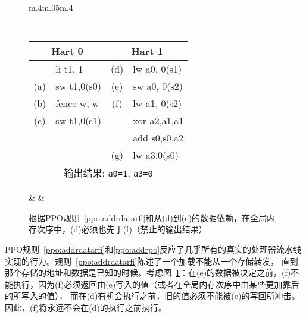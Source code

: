 \begin{figure}[h!]
  \centering
  \begin{tabular}{m{.4\linewidth}m{.05\linewidth}m{.4\linewidth}}
  {
    \tt\small
    \begin{tabular}{cl||cl}
    \multicolumn{2}{c}{Hart 0} & \multicolumn{2}{c}{Hart 1} \\
    \hline
          & li t1, 1    & (d) & lw a0, 0(s1)   \\
      (a) & sw t1,0(s0) & (e) & sw a0, 0(s2)   \\
      (b) & fence w, w  & (f) & lw a1, 0(s2)   \\
      (c) & sw t1,0(s1) &     & xor a2,a1,a1   \\
          &             &     & add s0,s0,a2   \\
          &             & (g) & lw a3,0(s0)    \\   
      \hline
      \multicolumn{4}{c}{输出结果: {\tt a0=1}, {\tt a3=0}}
    \end{tabular}
  } & &
  
  \end{tabular}

  \caption{根据PPO规则~\ref{ppo:addrdatarfi}和从(d)到(e)的数据依赖，在全局内存次序中，(d)必须也先于(f)（禁止的输出结果）
    }
  \label{fig:litmus:addrdatarfi}
\end{figure}

PPO规则~\ref{ppo:addrdatarfi}和\ref{ppo:addrpo}反应了几乎所有的真实的处理器流水线实现的行为。规则~\ref{ppo:addrdatarfi}陈述了一个加载不能从一个存储转发，
直到那个存储的地址和数据是已知的时候。考虑图~\ref{fig:litmus:addrdatarfi}：在(e)的数据被决定之前，(f)不能执行，因为(f)必须返回由(e)写入的值（或者在全局内存次序中由某些更加靠后的所写入的值），
而在(d)有机会执行之前，旧的值必须不能被(e)的写回所冲击。因此，(f)将永远不会在(d)的执行之前执行。

